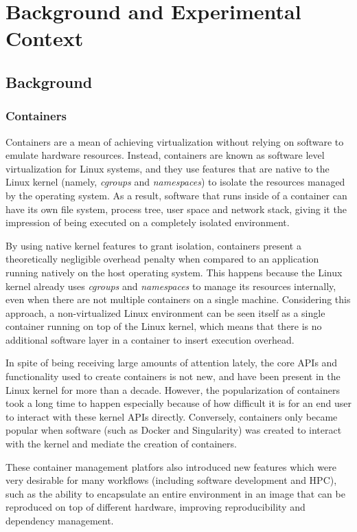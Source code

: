 \documentclass[12pt]{article}
\begin{document}
\section{Background and Experimental Context}
\subsection{Background}
\subsubsection{Containers}
Containers are a mean of achieving virtualization without relying on
software to emulate hardware resources. Instead, containers are known
as software level virtualization for Linux systems, and they use
features that are native to the Linux kernel (namely, \textit{cgroups}
and \textit{namespaces}) to isolate the resources managed by the
operating system. As a result, software that runs inside of a
container can have its own file system, process tree, user space and
network stack, giving it the impression of being executed on a
completely isolated environment.

By using native kernel features to grant isolation, containers present
a theoretically negligible overhead penalty when compared to an
application running natively on the host operating system. This
happens because the Linux kernel already uses \textit{cgroups} and
\textit{namespaces} to manage its resources internally, even when
there are not multiple containers on a single machine. Considering
this approach, a non-virtualized Linux environment can be seen itself
as a single container running on top of the Linux kernel, which means
that there is no additional software layer in a container to insert
execution overhead.

In spite of being receiving large amounts of attention lately, the
core APIs and functionality used to create containers is not new, and
have been present in the Linux kernel for more than a decade. However,
the popularization of containers took a long time to happen especially
because of how difficult it is for an end user to interact with these
kernel APIs directly. Conversely, containers only became popular when
software (such as Docker and Singularity) was created to interact with
the kernel and mediate the creation of containers.

These container management platfors also introduced new features which
were very desirable for many workflows (including software development
and HPC), such as the ability to encapsulate an entire environment in
an image that can be reproduced on top of different hardware,
improving reproducibility and dependency management.
\end{document}
